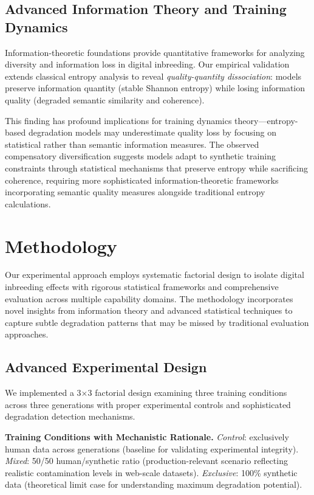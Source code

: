 \documentclass{article}
\begin{document}
\subsection{Advanced Information Theory and Training Dynamics}

Information-theoretic foundations \citep{shannon1948mathematical, cover1999elements} provide quantitative frameworks for analyzing diversity and information loss in digital inbreeding. Our empirical validation extends classical entropy analysis to reveal \textit{quality-quantity dissociation}: models preserve information quantity (stable Shannon entropy) while losing information quality (degraded semantic similarity and coherence).

This finding has profound implications for \citet{hoffmann2022training} training dynamics theory—entropy-based degradation models may underestimate quality loss by focusing on statistical rather than semantic information measures. The observed compensatory diversification suggests models adapt to synthetic training constraints through statistical mechanisms that preserve entropy while sacrificing coherence, requiring more sophisticated information-theoretic frameworks incorporating semantic quality measures alongside traditional entropy calculations.

\section{Methodology}

Our experimental approach employs systematic factorial design to isolate digital inbreeding effects with rigorous statistical frameworks and comprehensive evaluation across multiple capability domains. The methodology incorporates novel insights from information theory and advanced statistical techniques to capture subtle degradation patterns that may be missed by traditional evaluation approaches.

\subsection{Advanced Experimental Design}

We implemented a 3×3 factorial design examining three training conditions across three generations with proper experimental controls and sophisticated degradation detection mechanisms.

\textbf{Training Conditions with Mechanistic Rationale.} \textit{Control}: exclusively human data across generations (baseline for validating experimental integrity). \textit{Mixed}: 50/50 human/synthetic ratio (production-relevant scenario reflecting realistic contamination levels in web-scale datasets). \textit{Exclusive}: 100\% synthetic data (theoretical limit case for understanding maximum degradation potential).
\end{document}
